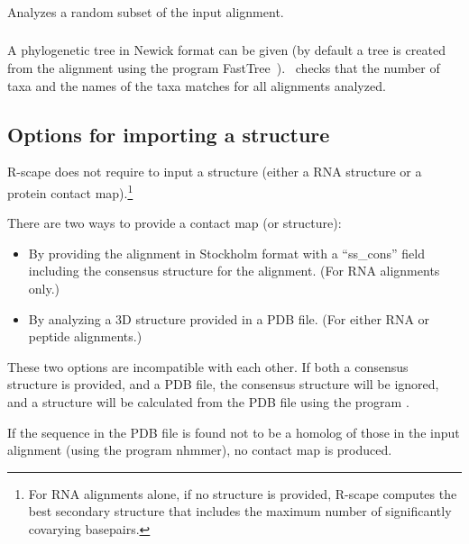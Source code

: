 \subsubsection{} Analyzes a random subset of the input alignment.

\subsubsection{} A phylogenetic tree in Newick format can be given (by default a tree is created 
from the alignment using the program FastTree~\citep{Price10}).  \rscape\ checks that the  number of taxa and the names
of the taxa matches for all alignments analyzed.



\subsection{Options for importing a structure}

R-scape does not require to input a structure (either a RNA structure
or a protein contact map).\footnote{ For RNA alignments alone, if no
structure is provided, R-scape computes the best secondary structure
that includes the maximum number of significantly covarying
basepairs.}
\vspace{1mm}

\noindent
There are two ways to provide a contact map (or structure):

\begin{itemize}
\item By providing the alignment in Stockholm format with a ``ss\_cons'' field including the consensus
structure for the alignment. (For RNA alignments only.)
\item By analyzing a 3D structure provided in a PDB file. (For either RNA or peptide alignments.)
\end{itemize}

\noindent
These two options are incompatible with each other. If both a consensus structure is provided, and a PDB
file, the consensus structure will be ignored, and a structure will be calculated from the PDB file
using the program .

\noindent
If the sequence in the PDB file is found not to be a homolog of those
in the input alignment (using the program nhmmer), no contact map is
produced.



